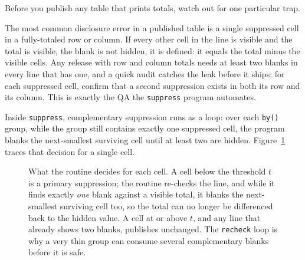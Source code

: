 Before you publish any table that prints totals, watch out for one particular trap.

\begin{vizcallout}
The most common disclosure error in a published table is a single suppressed cell in a fully-totaled row or column. If every other cell in the line is visible and the total is visible, the blank is not hidden, it is defined: it equals the total minus the visible cells. Any release with row and column totals needs at least two blanks in every line that has one, and a quick audit catches the leak before it ships: for each suppressed cell, confirm that a second suppression exists in both its row and its column. This is exactly the QA the \texttt{suppress} program automates.
\end{vizcallout}

Inside \texttt{suppress}, complementary suppression runs as a loop: over each \texttt{by()} group, while the group still contains exactly one suppressed cell, the program blanks the next-smallest surviving cell until at least two are hidden. Figure~\ref{fig:ch14-viz-suppress} traces that decision for a single cell.

\begin{figure}[htbp]
\centering
{}
\caption[The suppression decision, cell by cell]{What the routine decides for each cell. A cell below the threshold $t$ is a primary suppression; the routine re-checks the line, and while it finds exactly \emph{one} blank against a visible total, it blanks the next-smallest surviving cell too, so the total can no longer be differenced back to the hidden value. A cell at or above $t$, and any line that already shows two blanks, publishes unchanged. The \texttt{recheck} loop is why a very thin group can consume several complementary blanks before it is safe.}
\label{fig:ch14-viz-suppress}
\end{figure}

